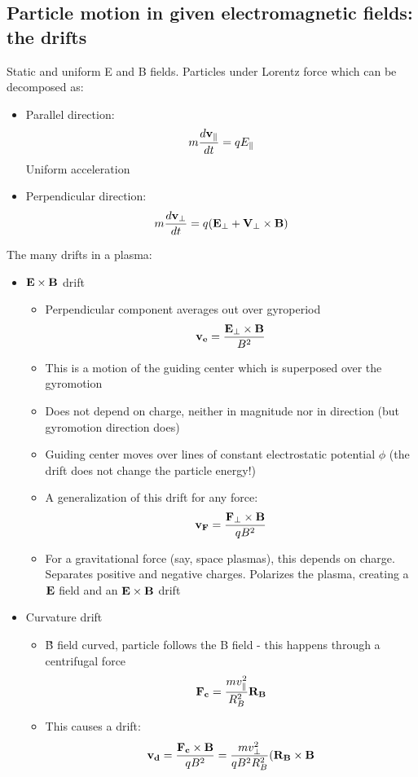 	\subsection{Particle motion in given electromagnetic fields: the drifts }
Static and uniform E and B fields. Particles under Lorentz force which can be decomposed as:
	\begin{itemize}
		\item Parallel direction: \[m\frac{d \mathbf{v_{\parallel}}}{d t}=qE_{\parallel}\]
	Uniform acceleration
		\item Perpendicular direction: \[m\frac{d \mathbf{v_{\perp}}}{d t}=q(\mathbf{E_{\perp}} + \mathbf{V_{	\perp}}\times\mathbf{B})\]
	\end{itemize}
The many drifts in a plasma:
	\begin{itemize}
		\item $\mathbf{E}\times\mathbf{B}$ drift
		\begin{itemize}
			\item Perpendicular component averages out over gyroperiod
			\[\mathbf{v_e}=\frac{\mathbf{E_{\perp}}\times\mathbf{B}}{B^2}\]
			\item This is a motion of the guiding center which is superposed over the gyromotion
			\item Does not depend on charge, neither in magnitude nor in direction (but gyromotion direction does)
			\item Guiding center moves over lines of constant electrostatic potential $\phi$ (the drift does not change the particle energy!)
			\item A generalization of this drift for any force: \[\mathbf{v_F}=\frac{\mathbf{F_{\perp}}\times\mathbf{B}}{qB^2}\]
			\item For a gravitational force (say, space plasmas), this depends on charge. Separates positive and negative charges. Polarizes the plasma, creating a $\mathbf{E}$ field and an $\mathbf{E}\times\mathbf{B}$ drift
		\end{itemize}
		
		\item Curvature drift
		\begin{itemize}
			\item \v{B} field curved, particle follows the B field - this happens through a centrifugal force
			\[\mathbf{F_c}=\frac{m v_{\parallel}^2}{R_B^2} \mathbf{R_B}\]
			\item This causes a drift:
			\[\mathbf{v_d} = \frac{\mathbf{F_c} \times \mathbf{B}}{q B^2} = \frac{m v_{\perp}^2}{q B^2 R_B^2} (\mathbf{R_B} \times \mathbf{B}\]
		\end{itemize}
		

\end{itemize}
